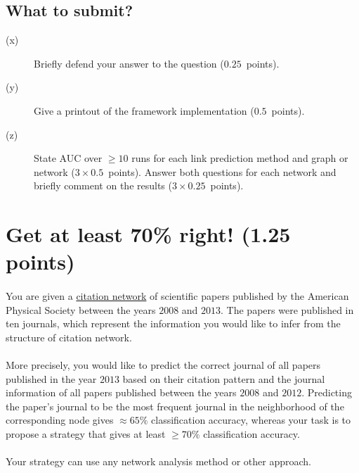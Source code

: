 \documentclass[11pt,a4paper]{article}
\newcommand{\points}[1]{({\color{magenta}$#1$~points})}
\newcommand{\totals}[1]{({\color{magenta}#1 points})}
\begin{document}
\subsection*{What to submit?}

\begin{description}
	\item[(x)] Briefly defend your answer to the question \points{0.25}.
	\item[(y)] Give a printout of the framework implementation \points{0.5}.
	\item[(z)] State AUC over $\geq 10$ runs for each link prediction method and graph or network \points{3\times 0.5}. Answer both questions for each network and briefly comment on the results \points{3\times 0.25}.
\end{description}

\section{Get at least 70\% right! \totals{1.25}}

\paragraph{} You are given a \href{http://lovro.lpt.fri.uni-lj.si/ina/nets/aps_2008_2013}{citation network} of scientific papers published by the American Physical Society between the years $2008$ and $2013$. The papers were published in ten journals, which represent the information you would like to infer from the structure of citation network. 

\paragraph{} More precisely, you would like to predict the correct journal of all papers published in the year $2013$ based on their citation pattern and the journal information of all papers published between the years $2008$ and $2012$. Predicting the paper's journal to be the most frequent journal in the neighborhood of the corresponding node gives $\approx 65\%$ classification accuracy, whereas your task is to propose a strategy that gives at least $\geq 70\%$ classification accuracy. 

\paragraph{} Your strategy can use any network analysis method or other approach.
\end{document}

